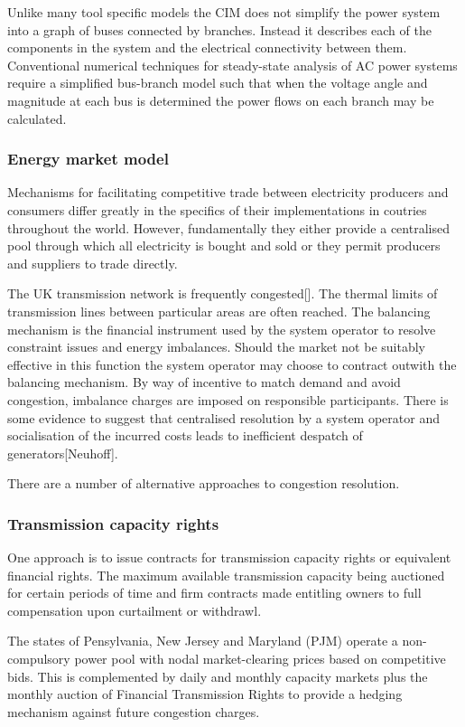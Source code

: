 Unlike many tool specific models the CIM does not simplify the power system
into a graph of buses connected by branches.  Instead it describes each of the
components in the system and the electrical connectivity between them.
Conventional numerical techniques for steady-state analysis of AC power
systems require a simplified bus-branch model such that when the voltage angle
and magnitude at each bus is determined the power flows on each branch may be
calculated.


\subsubsection{Energy market model}
Mechanisms for facilitating competitive trade between electricity producers and
consumers differ greatly in the specifics of their implementations in coutries
throughout the world.  However, fundamentally they either provide a
centralised pool through which all electricity is bought and sold or they
permit producers and suppliers to trade directly.

The UK transmission network is frequently congested[].  The thermal limits of
transmission lines between particular areas are often reached.  The balancing
mechanism is the financial instrument used by the system operator to resolve
constraint issues and energy imbalances.  Should the market not be suitably
effective in this function the system operator may choose to contract outwith
the balancing mechanism.  By way of incentive to match demand and avoid
congestion, imbalance charges are imposed on responsible participants.  There
is some evidence to suggest that centralised resolution by a system operator
and socialisation of the incurred costs leads to inefficient despatch of
generators[Neuhoff].

There are a number of alternative approaches to congestion
resolution\cite{neuhoff:power}.

\subsubsection{Transmission capacity rights}
One approach is to issue contracts for transmission capacity rights or
equivalent financial rights.  The maximum available transmission capacity
being auctioned for certain periods of time and firm contracts made entitling
owners to full compensation upon curtailment or
withdrawl\cite{efet:principles}.

The states of Pensylvania, New Jersey and Maryland (PJM) operate a
non-compulsory power pool with nodal market-clearing prices based on
competitive bids.  This is complemented by daily and monthly capacity markets
plus the monthly auction of Financial Transmission Rights to provide a hedging
mechanism against future congestion charges.


